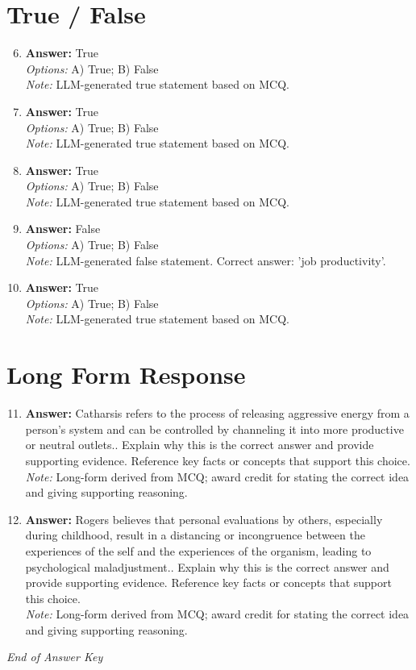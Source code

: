 \documentclass[12pt]{article}
\begin{document}
\section*{True / False}
\begin{enumerate}[label=\arabic*.]
\setcounter{enumi}{5}
\item \textbf{Answer:} True
\\ \textit{Options:} A) True; B) False
\\ \textit{Note:} LLM-generated true statement based on MCQ.
\item \textbf{Answer:} True
\\ \textit{Options:} A) True; B) False
\\ \textit{Note:} LLM-generated true statement based on MCQ.
\item \textbf{Answer:} True
\\ \textit{Options:} A) True; B) False
\\ \textit{Note:} LLM-generated true statement based on MCQ.
\item \textbf{Answer:} False
\\ \textit{Options:} A) True; B) False
\\ \textit{Note:} LLM-generated false statement. Correct answer: 'job productivity'.
\item \textbf{Answer:} True
\\ \textit{Options:} A) True; B) False
\\ \textit{Note:} LLM-generated true statement based on MCQ.
\end{enumerate}

\section*{Long Form Response}
\begin{enumerate}[label=\arabic*.]
\setcounter{enumi}{10}
\item \textbf{Answer:} Catharsis refers to the process of releasing aggressive energy from a person's system and can be controlled by channeling it into more productive or neutral outlets.. Explain why this is the correct answer and provide supporting evidence. Reference key facts or concepts that support this choice.
\\ \textit{Note:} Long-form derived from MCQ; award credit for stating the correct idea and giving supporting reasoning.
\item \textbf{Answer:} Rogers believes that personal evaluations by others, especially during childhood, result in a distancing or incongruence between the experiences of the self and the experiences of the organism, leading to psychological maladjustment.. Explain why this is the correct answer and provide supporting evidence. Reference key facts or concepts that support this choice.
\\ \textit{Note:} Long-form derived from MCQ; award credit for stating the correct idea and giving supporting reasoning.
\end{enumerate}

\vfill
\noindent\textit{End of Answer Key}
\end{document}
